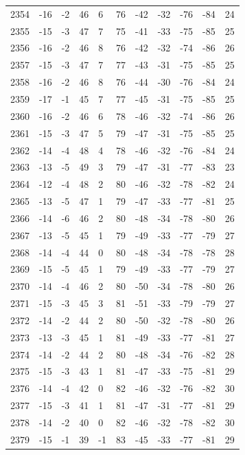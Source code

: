 \begin{table}[H]
\begin{tabular}{lllllllllll}
2354 & -16 & -2 & 46 & 6 & 76 & -42 & -32 & -76 & -84 & 24 \\
2355 & -15 & -3 & 47 & 7 & 75 & -41 & -33 & -75 & -85 & 25 \\
2356 & -16 & -2 & 46 & 8 & 76 & -42 & -32 & -74 & -86 & 26 \\
2357 & -15 & -3 & 47 & 7 & 77 & -43 & -31 & -75 & -85 & 25 \\
2358 & -16 & -2 & 46 & 8 & 76 & -44 & -30 & -76 & -84 & 24 \\
2359 & -17 & -1 & 45 & 7 & 77 & -45 & -31 & -75 & -85 & 25 \\
2360 & -16 & -2 & 46 & 6 & 78 & -46 & -32 & -74 & -86 & 26 \\
2361 & -15 & -3 & 47 & 5 & 79 & -47 & -31 & -75 & -85 & 25 \\
2362 & -14 & -4 & 48 & 4 & 78 & -46 & -32 & -76 & -84 & 24 \\
2363 & -13 & -5 & 49 & 3 & 79 & -47 & -31 & -77 & -83 & 23 \\
2364 & -12 & -4 & 48 & 2 & 80 & -46 & -32 & -78 & -82 & 24 \\
2365 & -13 & -5 & 47 & 1 & 79 & -47 & -33 & -77 & -81 & 25 \\
2366 & -14 & -6 & 46 & 2 & 80 & -48 & -34 & -78 & -80 & 26 \\
2367 & -13 & -5 & 45 & 1 & 79 & -49 & -33 & -77 & -79 & 27 \\
2368 & -14 & -4 & 44 & 0 & 80 & -48 & -34 & -78 & -78 & 28 \\
2369 & -15 & -5 & 45 & 1 & 79 & -49 & -33 & -77 & -79 & 27 \\
2370 & -14 & -4 & 46 & 2 & 80 & -50 & -34 & -78 & -80 & 26 \\
2371 & -15 & -3 & 45 & 3 & 81 & -51 & -33 & -79 & -79 & 27 \\
2372 & -14 & -2 & 44 & 2 & 80 & -50 & -32 & -78 & -80 & 26 \\
2373 & -13 & -3 & 45 & 1 & 81 & -49 & -33 & -77 & -81 & 27 \\
2374 & -14 & -2 & 44 & 2 & 80 & -48 & -34 & -76 & -82 & 28 \\
2375 & -15 & -3 & 43 & 1 & 81 & -47 & -33 & -75 & -81 & 29 \\
2376 & -14 & -4 & 42 & 0 & 82 & -46 & -32 & -76 & -82 & 30 \\
2377 & -15 & -3 & 41 & 1 & 81 & -47 & -31 & -77 & -81 & 29 \\
2378 & -14 & -2 & 40 & 0 & 82 & -46 & -32 & -78 & -82 & 30 \\
2379 & -15 & -1 & 39 & -1 & 83 & -45 & -33 & -77 & -81 & 29 \\

\end{tabular}
\end{table}
